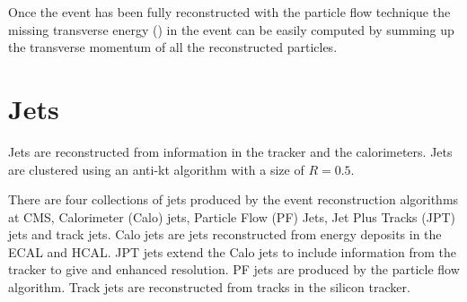 Once the event has been fully reconstructed with the particle flow technique
the missing transverse energy (\ETm) in the event can be easily computed by
summing up the transverse momentum of all the reconstructed particles.\cite{PF}

\section{Jets}
Jets are reconstructed from information in the tracker and the calorimeters.
Jets are clustered using an anti-kt algorithm  with a size of
$R=0.5$.

There are four collections of jets produced by the event reconstruction
algorithms at CMS, Calorimeter (Calo) jets, Particle Flow (PF) Jets, Jet Plus
Tracks (JPT) jets and track jets. Calo jets are jets reconstructed from energy
deposits in the ECAL and HCAL. JPT jets extend the Calo jets to include
information from the tracker to give and enhanced \pT resolution. PF jets are
produced by the particle flow algorithm\cite{PF}. Track jets are reconstructed from
tracks in the silicon tracker.

